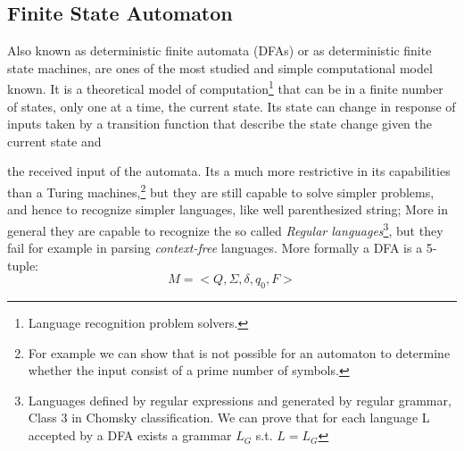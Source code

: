 \subsection{Finite State Automaton}\label{DFA}
Also known as deterministic finite automata (DFAs) or as deterministic finite
state machines, are ones of the most studied and simple computational model
known.
 It is a theoretical model of computation\footnote{Language recognition
problem solvers.} that can be in a finite number of states, only one at a time,
the current state. Its state can change in response of inputs taken by a
transition function that describe the state change given the current state and
\begin{table}
 \caption{Tabular representation of a DFM's next-state function}
 \label{tab:tabularTransitionFunction}
\end{table} 
the received input of the automata.
Its a much more restrictive in its capabilities than a Turing
machines,\footnote{For example we can show that is not possible for an
automaton to determine whether the input consist of a prime number of symbols.}
but they are still capable to solve simpler problems, and hence to recognize
simpler languages, like well parenthesized string; More in general they are capable
to recognize the so called \emph{Regular languages}\footnote{Languages
defined by regular expressions and generated by regular grammar, Class 3 in
Chomsky classification. We can prove that for each language L accepted by a DFA
exists a grammar \begin{math}L_G \end{math} s.t. \begin{math} L=L_G\end{math}},
but they fail for example in parsing \emph{context-free} languages.
More formally a DFA is a 5-tuple:
\[M = <Q,\Sigma,\delta,q_0,F>\] 

